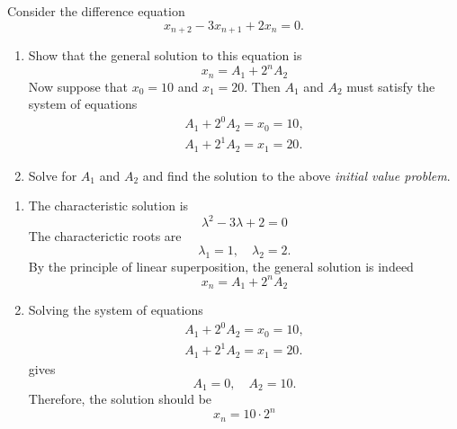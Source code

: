 \begin{homeworkProblem}
    Consider the difference equation
    \[
        x_{n+2} - 3x_{n+1} + 2x_n = 0.
    \]
    \begin{enumerate}
        \item Show that the general solution to this equation is
        \[
            x_n = A_1 + 2^n A_2
        \]
        Now suppose that $x_0 = 10$ and $x_1 = 20$. Then $A_1$ and $A_2$ must
        satisfy the system of equations
        \[
            \begin{aligned}
                A_1 + 2^0 A_2 = x_0 = 10,\\
                A_1 + 2^1 A_2 = x_1 = 20.
            \end{aligned}
        \]
    \item Solve for $A_1$ and $A_2$ and find the solution to the above
    \textit{initial value problem}.
    \end{enumerate}
    
    \segline
    
    \solution
    
    \begin{enumerate}
        \item The characteristic solution is \[
            \lambda^2 - 3 \lambda + 2 = 0
        \]
        The characterictic roots are \[
            \lambda_1 = 1, \quad \lambda_2 = 2.
        \]
        By the principle of linear superposition, the general solution is indeed \[
            x_n = A_1 + 2^n A_2
        \]
        \item Solving the system of equations
        \[
            \begin{aligned}
                A_1 + 2^0 A_2 = x_0 = 10,\\
                A_1 + 2^1 A_2 = x_1 = 20.
            \end{aligned}
        \] gives \[
            A_1 = 0, \quad A_2 = 10.
        \]
        Therefore, the solution should be \[
            x_n = 10 \cdot 2^n
        \]
    \end{enumerate}
    \end{homeworkProblem}